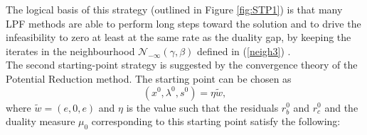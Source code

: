 \documentclass[a4paper,10 pt,titlepage,twoside]{book}
\theoremstyle{plain}
\theoremstyle{definition}
\theoremstyle{remark}
\begin{document}
The logical basis of this strategy (outlined in Figure \ref{fig:STP1}) is that many LPF methods are able to perform long steps toward the solution and to drive the infeasibility to zero at least at the same rate as the duality gap, by keeping the iterates in the neighbourhood $\mathcal{N}_{-\infty}(\gamma,\beta)$ defined in (\ref{neigh3}) \cite{SPS}.\\[1 cm]
The second starting-point strategy is suggested by the convergence theory of the Potential Reduction method. The starting point can be chosen as \begin{equation*}
(x^{0}, \lambda^{0}, s^{0}) = \eta \tilde{w},
\end{equation*}where $\tilde{w} = (e,0,e)$ and $\eta$ is the value such that the residuals $r_{b}^{0}$ and $r_{c}^{0}$ and the duality measure $\mu_{0}$ corresponding to this starting point satisfy the following:
\end{document}
